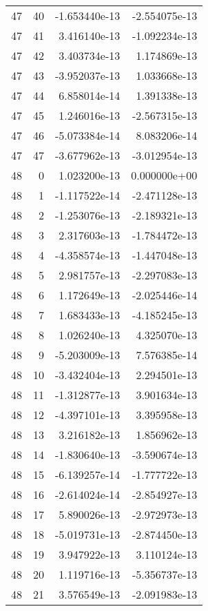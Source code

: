 \begin{tabular}{rrrr}
  47 &   40 & -1.653440e-13 & -2.554075e-13 \\
  47 &   41 &  3.416140e-13 & -1.092234e-13 \\
  47 &   42 &  3.403734e-13 &  1.174869e-13 \\
  47 &   43 & -3.952037e-13 &  1.033668e-13 \\
  47 &   44 &  6.858014e-14 &  1.391338e-13 \\
  47 &   45 &  1.246016e-13 & -2.567315e-13 \\
  47 &   46 & -5.073384e-14 &  8.083206e-14 \\
  47 &   47 & -3.677962e-13 & -3.012954e-13 \\
  48 &    0 &  1.023200e-13 &  0.000000e+00 \\
  48 &    1 & -1.117522e-14 & -2.471128e-13 \\
  48 &    2 & -1.253076e-13 & -2.189321e-13 \\
  48 &    3 &  2.317603e-13 & -1.784472e-13 \\
  48 &    4 & -4.358574e-13 & -1.447048e-13 \\
  48 &    5 &  2.981757e-13 & -2.297083e-13 \\
  48 &    6 &  1.172649e-13 & -2.025446e-14 \\
  48 &    7 &  1.683433e-13 & -4.185245e-13 \\
  48 &    8 &  1.026240e-13 &  4.325070e-13 \\
  48 &    9 & -5.203009e-13 &  7.576385e-14 \\
  48 &   10 & -3.432404e-13 &  2.294501e-13 \\
  48 &   11 & -1.312877e-13 &  3.901634e-13 \\
  48 &   12 & -4.397101e-13 &  3.395958e-13 \\
  48 &   13 &  3.216182e-13 &  1.856962e-13 \\
  48 &   14 & -1.830640e-13 & -3.590674e-13 \\
  48 &   15 & -6.139257e-14 & -1.777722e-13 \\
  48 &   16 & -2.614024e-14 & -2.854927e-13 \\
  48 &   17 &  5.890026e-13 & -2.972973e-13 \\
  48 &   18 & -5.019731e-13 & -2.874450e-13 \\
  48 &   19 &  3.947922e-13 &  3.110124e-13 \\
  48 &   20 &  1.119716e-13 & -5.356737e-13 \\
  48 &   21 &  3.576549e-13 & -2.091983e-13 \\

\end{tabular}
